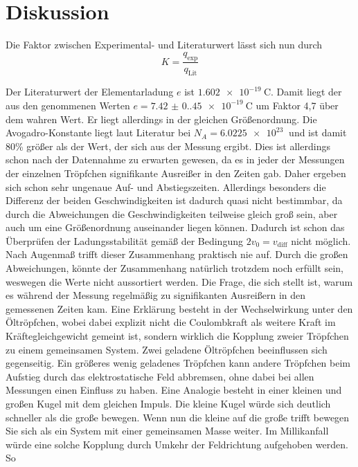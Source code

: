 \section{Diskussion}
Die Faktor zwischen Experimental- und Literaturwert lässt sich nun durch 
\begin{equation}
    K =\frac{q_\text{exp}}{q_\text{Lit}}
\end{equation}

Der Literaturwert der Elementarladung $e$ ist $\qty{1.602e-19}{\coulomb}$\cite{PhysikTabellen}. Damit liegt der aus den genommenen Werten 
$e=\qty{7.42(0.45)e-19}{\coulomb}$ um Faktor 4,7 über dem wahren Wert. Er liegt allerdings in der gleichen Größenordnung.
Die Avogadro-Konstante liegt laut Literatur bei $N_A=\qty{6.0225e23}{}$\cite{PhysikTabellen} und ist damit 80\% größer als der Wert, der sich aus der Messung
ergibt. Dies ist allerdings schon nach der Datennahme zu erwarten gewesen, da es in jeder der Messungen der einzelnen Tröpfchen signifikante
Ausreißer in den Zeiten gab. Daher ergeben sich schon sehr ungenaue Auf- und Abstiegszeiten. Allerdings besonders die Differenz der beiden
Geschwindigkeiten ist dadurch quasi nicht bestimmbar, da durch die Abweichungen die Geschwindigkeiten teilweise gleich groß sein, aber auch um eine Größenordnung auseinander liegen können.
Dadurch ist schon das Überprüfen der Ladungsstabilität gemäß der Bedingung $2v_0=v_\text{diff}$ nicht möglich.
Nach Augenmaß trifft dieser Zusammenhang praktisch nie auf. Durch die großen Abweichungen, könnte der Zusammenhang natürlich trotzdem 
noch erfüllt sein, weswegen die Werte nicht aussortiert werden. Die Frage, die sich stellt ist, warum es während der Messung regelmäßig zu signifikanten
Ausreißern in den gemessenen Zeiten kam. Eine Erklärung besteht in der Wechselwirkung unter den Öltröpfchen, wobei dabei explizit nicht die Coulombkraft als weitere Kraft im
Kräftegleichgewicht gemeint ist, sondern wirklich die Kopplung zweier Tröpfchen zu einem gemeinsamen System. Zwei geladene Öltröpfchen
beeinflussen sich gegenseitig. Ein größeres wenig geladenes Tröpfchen kann andere Tröpfchen beim Aufstieg durch das elektrostatische Feld abbremsen,
ohne dabei bei allen Messungen einen Einfluss zu haben. Eine Analogie besteht in einer kleinen und großen Kugel mit dem gleichen Impuls. Die kleine Kugel würde sich deutlich schneller als die große bewegen.
Wenn nun die kleine auf die große trifft bewegen Sie sich als ein System mit einer gemeinsamen Masse weiter. Im Millikanfall würde eine solche Kopplung durch Umkehr der Feldrichtung aufgehoben werden. So 
